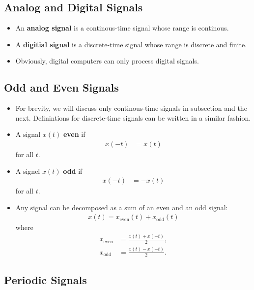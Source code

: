 \documentclass[10pt]{article}
\newcommand{\mrm}[1]{\mathrm{#1}}
\begin{document}
\subsection{Analog and Digital Signals}

\begin{itemize}
  \item An {\bf analog signal} is a continous-time signal whose range is continous.
  
  \item A {\bf digitial signal} is a discrete-time signal whose range is discrete and finite.
  
  \item Obviously, digital computers can only process digital signals.
\end{itemize}

\subsection{Odd and Even Signals}

\begin{itemize}
  \item For brevity, we will discuss only continous-time signals in subsection and the next. Definintions for discrete-time signals can be written in a similar fashion.

  \item A signal $x(t)$ {\bf even} if
  \begin{align*}
    x(-t) &= x(t) 
  \end{align*}
  for all $t$.

  \item A signel $x(t)$ {\bf odd} if 
  \begin{align*}
    x(-t) &= -x(t)
  \end{align*}
  for all $t$.

  \item Any signal can be decomposed as a sum of an even and an odd signal:
  \begin{align*}
    x(t) = x_{\mrm{even}}(t) + x_{\mrm{odd}}(t)
  \end{align*}
  where
  \begin{align*}
    x_{\mrm{even}} &= \frac{x(t) + x(-t)}{2},\\
    x_{\mrm{odd}} &= \frac{x(t) - x(-t)}{2}.
  \end{align*}
\end{itemize}

\subsection{Periodic Signals}
\end{document}
